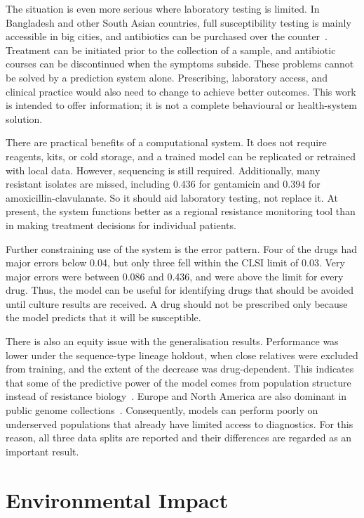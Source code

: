 The situation is even more serious where laboratory testing is limited. In Bangladesh and other
South Asian countries, full susceptibility testing is mainly accessible in big cities, and
antibiotics can be purchased over the counter~\cite{who_amr_2019, Branda2024}. Treatment can be
initiated prior to the collection of a sample, and antibiotic courses can be discontinued when
the symptoms subside. These problems cannot be solved by a prediction system alone. Prescribing,
laboratory access, and clinical practice would also need to change to achieve better outcomes.
This work is intended to offer information; it is not a complete behavioural or health-system
solution.

There are practical benefits of a computational system. It does not require reagents, kits, or
cold storage, and a trained model can be replicated or retrained with local data. However,
sequencing is still required. Additionally, many resistant isolates are missed, including 0.436
for gentamicin and 0.394 for amoxicillin-clavulanate. So it should aid laboratory testing, not
replace it. At present, the system functions better as a regional resistance monitoring tool
than in making treatment decisions for individual patients.

Further constraining use of the system is the error pattern. Four of the drugs had major errors
below 0.04, but only three fell within the CLSI limit of 0.03. Very major errors were between
0.086 and 0.436, and were above the limit for every drug. Thus, the model can be useful for
identifying drugs that should be avoided until culture results are received. A drug should not
be prescribed only because the model predicts that it will be susceptible.

There is also an equity issue with the generalisation results. Performance was lower under the
sequence-type lineage holdout, when close relatives were excluded from training, and the extent
of the decrease was drug-dependent. This indicates that some of the predictive power of the
model comes from population structure instead of resistance biology~\cite{Yu2025}. Europe and
North America are also dominant in public genome collections~\cite{Yu2025}. Consequently,
models can perform poorly on underserved populations that already have limited access to
diagnostics. For this reason, all three data splits are reported and their differences are
regarded as an important result.

\section{Environmental Impact}
\label{sec:environment}

